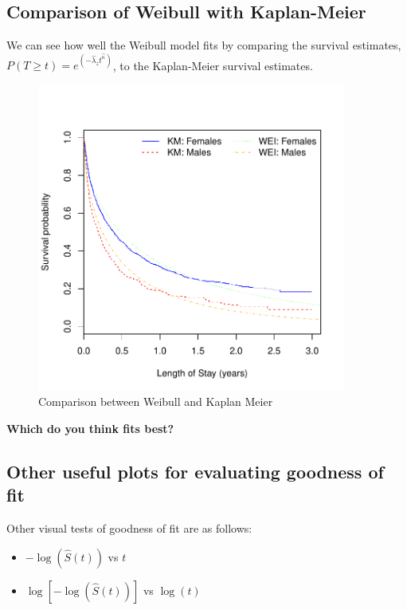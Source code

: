 \documentclass[11pt,psfig]{book}
\begin{document}
\subsection{Comparison of Weibull with Kaplan-Meier}
We can see how well the Weibull model fits by comparing
the survival estimates, $P(T\ge t)=e^{(-\hat\lambda_z t^{\hat\kappa})}$,
to the Kaplan-Meier survival estimates.
\begin{figure}[h!]
\caption{Comparison between Weibull and Kaplan Meier}
\centerline{\includegraphics[width=4in]{ch12weib.pdf}}
\end{figure}
{\bf Which do you think fits best?}
\subsection{Other useful plots for evaluating goodness of fit}
Other visual tests of goodness of fit are as follows:
\begin{itemize}
\item  $-\log(\hat{S}(t))$ vs $t$

\item  $\log[-\log(\hat{S}(t))]$ vs $\log(t)$
\end{itemize}
\end{document}
